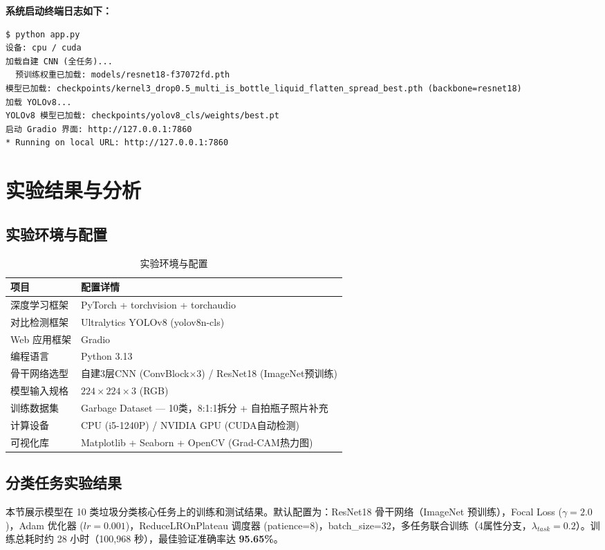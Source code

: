 \documentclass[11pt,a4paper]{ctexart}
\begin{document}
\vspace{4pt}
\textbf{系统启动终端日志如下：}
\begin{lstlisting}
$ python app.py
设备: cpu / cuda
加载自建 CNN (全任务)...
  预训练权重已加载: models/resnet18-f37072fd.pth
模型已加载: checkpoints/kernel3_drop0.5_multi_is_bottle_liquid_flatten_spread_best.pth (backbone=resnet18)
加载 YOLOv8...
YOLOv8 模型已加载: checkpoints/yolov8_cls/weights/best.pt
启动 Gradio 界面: http://127.0.0.1:7860
* Running on local URL: http://127.0.0.1:7860
\end{lstlisting}

\section{实验结果与分析}

\subsection{实验环境与配置}

\begin{table}[H]
\centering
\caption{实验环境与配置}
\begin{tabular}{ll}
\toprule
\textbf{项目} & \textbf{配置详情} \\
\midrule
深度学习框架 & PyTorch + torchvision + torchaudio \\
对比检测框架 & Ultralytics YOLOv8 (yolov8n-cls) \\
Web 应用框架 & Gradio \\
编程语言 & Python 3.13 \\
骨干网络选型 & 自建3层CNN (ConvBlock$\times$3) / ResNet18 (ImageNet预训练) \\
模型输入规格 & $224 \times 224 \times 3$ (RGB) \\
训练数据集 & Garbage Dataset — 10类，8:1:1拆分 + 自拍瓶子照片补充 \\
计算设备 & CPU (i5-1240P) / NVIDIA GPU (CUDA自动检测) \\
可视化库 & Matplotlib + Seaborn + OpenCV (Grad-CAM热力图) \\
\bottomrule
\end{tabular}
\end{table}

\subsection{分类任务实验结果}

本节展示模型在 10 类垃圾分类核心任务上的训练和测试结果。默认配置为：ResNet18 骨干网络（ImageNet 预训练），Focal Loss ($\gamma=2.0$)，Adam 优化器 ($lr=0.001$)，ReduceLROnPlateau 调度器 (patience=8)，batch\_size=32，多任务联合训练（4属性分支，$\lambda_{task}=0.2$）。训练总耗时约 28 小时（100,968 秒），最佳验证准确率达 \textbf{95.65\%}。
\end{document}
